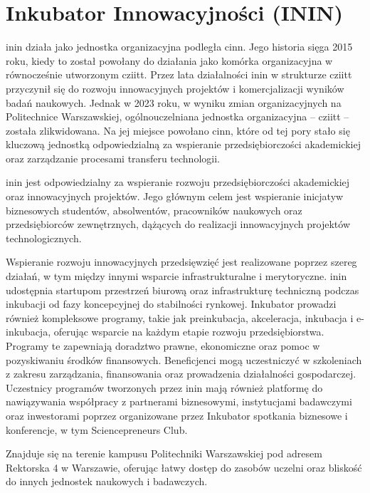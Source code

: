 \section{Inkubator Innowacyjności (ININ)}  \gls{inin} działa jako jednostka organizacyjna podległa  \gls{cinn}. Jego historia sięga 2015 roku, kiedy to został powołany do działania jako komórka organizacyjna w równocześnie utworzonym  \gls{cziitt}.\cite{RegulaminININ2015} Przez lata działalności \gls{inin} w strukturze \gls{cziitt} przyczynił się do rozwoju innowacyjnych projektów i komercjalizacji wyników badań naukowych. Jednak w 2023 roku, w wyniku zmian organizacyjnych na Politechnice Warszawskiej, ogólnouczelniana jednostka organizacyjna – \gls{cziitt} – została zlikwidowana.\cite{ZarządzenieCINN2023} Na jej miejsce powołano \gls{cinn}, które od tej pory stało się kluczową jednostką odpowiedzialną za wspieranie przedsiębiorczości akademickiej oraz zarządzanie procesami transferu technologii.

\gls{inin} jest odpowiedzialny za wspieranie rozwoju przedsiębiorczości akademickiej oraz innowacyjnych projektów. Jego głównym celem jest wspieranie inicjatyw biznesowych studentów, absolwentów, pracowników naukowych oraz przedsiębiorców zewnętrznych, dążących do realizacji innowacyjnych projektów technologicznych.

Wspieranie rozwoju innowacyjnych przedsięwzięć jest realizowane poprzez szereg działań, w tym między innymi wsparcie infrastrukturalne i merytoryczne. \gls{inin} udostępnia startupom przestrzeń biurową oraz infrastrukturę techniczną podczas inkubacji od fazy koncepcyjnej do stabilności rynkowej.  Inkubator prowadzi również kompleksowe programy, takie jak preinkubacja, akceleracja, inkubacja i e-inkubacja, oferując wsparcie na każdym etapie rozwoju przedsiębiorstwa. Programy te zapewniają doradztwo prawne, ekonomiczne oraz pomoc w pozyskiwaniu środków finansowych. Beneficjenci mogą uczestniczyć w szkoleniach z zakresu zarządzania, finansowania oraz prowadzenia działalności gospodarczej. Uczestnicy programów tworzonych przez \gls{inin} mają również platformę do nawiązywania współpracy z partnerami biznesowymi, instytucjami badawczymi oraz inwestorami poprzez organizowane przez Inkubator spotkania biznesowe i konferencje, w tym Sciencepreneurs Club. 

Znajduje się na terenie kampusu Politechniki Warszawskiej pod adresem Rektorska 4 w Warszawie, oferując łatwy dostęp do zasobów uczelni oraz bliskość do innych jednostek naukowych i badawczych.


